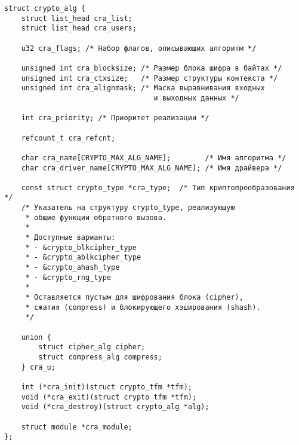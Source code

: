 \begin{verbatim}
struct crypto_alg {
    struct list_head cra_list;
    struct list_head cra_users;

    u32 cra_flags; /* Набор флагов, описывающих алгоритм */

    unsigned int cra_blocksize; /* Размер блока шифра в байтах */
    unsigned int cra_ctxsize;   /* Размер структуры контекста */
    unsigned int cra_alignmask; /* Маска выравнивания входных
                                   и выходных данных */

    int cra_priority; /* Приоритет реализации */

    refcount_t cra_refcnt;

    char cra_name[CRYPTO_MAX_ALG_NAME];        /* Имя алгоритма */
    char cra_driver_name[CRYPTO_MAX_ALG_NAME]; /* Имя драйвера */

    const struct crypto_type *cra_type;  /* Тип криптопреобразования */
    /* Указатель на структуру crypto_type, реализующую
     * общие функции обратного вызова.
     *
     * Доступные варианты:
     * - &crypto_blkcipher_type
     * - &crypto_ablkcipher_type
     * - &crypto_ahash_type
     * - &crypto_rng_type
     *
     * Оставляется пустым для шифрования блока (cipher),
     * сжатия (compress) и блокирующего хэширования (shash).
     */

    union {
        struct cipher_alg cipher;
        struct compress_alg compress;
    } cra_u;

    int (*cra_init)(struct crypto_tfm *tfm);
    void (*cra_exit)(struct crypto_tfm *tfm);
    void (*cra_destroy)(struct crypto_alg *alg);

    struct module *cra_module;
};
\end{verbatim}
